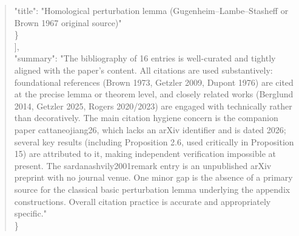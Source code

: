 \documentclass[11pt]{article}
\begin{document}
\begin{quote}
      "title": "Homological perturbation lemma (Gugenheim--Lambe--Stasheff or Brown 1967 original source)"\\
    \}\\
  ],\\
  "summary": "The bibliography of 16 entries is well-curated and tightly aligned with the paper's content. All citations are used substantively: foundational references (Brown 1973, Getzler 2009, Dupont 1976) are cited at the precise lemma or theorem level, and closely related works (Berglund 2014, Getzler 2025, Rogers 2020/2023) are engaged with technically rather than decoratively. The main citation hygiene concern is the companion paper cattaneojiang26, which lacks an arXiv identifier and is dated 2026; several key results (including Proposition 2.6, used critically in Proposition 15) are attributed to it, making independent verification impossible at present. The sardanashvily2001remark entry is an unpublished arXiv preprint with no journal venue. One minor gap is the absence of a primary source for the classical basic perturbation lemma underlying the appendix constructions. Overall citation practice is accurate and appropriately specific."\\
\}\\
\end{quote}
\end{document}
